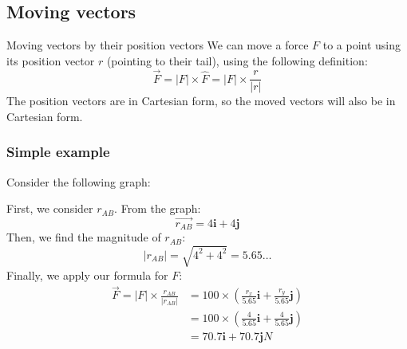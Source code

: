 \documentclass{article}
\begin{document}
\subsection{Moving vectors}
\begin{definition}
  {Moving vectors by their position vectors}
  We can move a force $F$ to a point using its position vector $r$ (pointing to their tail), using the following definition:
  \[\vec{F}=|F|\times\hat{F}=|F|\times\frac{r}{|r|}\]
  The position vectors are in Cartesian form, so the moved vectors will also be in Cartesian form.
\end{definition}
\subsubsection{Simple example}
\begin{center}
  Consider the following graph:
  \begin{figure}[!ht]
    \centering
  \end{figure}

  First, we consider $r_{AB}$. From the graph:
  \[\vec{r_{AB}}=4\boldsymbol{i}+4\boldsymbol{j}\]
  Then, we find the magnitude of $r_{AB}$:
  \[|r_{AB}|=\sqrt{4^2+4^2}=5.65\dots\]
  Finally, we apply our formula for $F$:
  \begin{align*}
    \vec{F}=|F|\times\frac{r_{AB}}{|r_{AB}|} & =100\times(\frac{r_x}{5.65}\boldsymbol{i}+\frac{r_y}{5.65}\boldsymbol{j}) \\&=100\times(\frac{4}{5.65}\boldsymbol{i}+\frac{4}{5.65}\boldsymbol{j})\\&=70.7\boldsymbol{i}+70.7\boldsymbol{j}N
  \end{align*}
\end{center}
\end{document}
